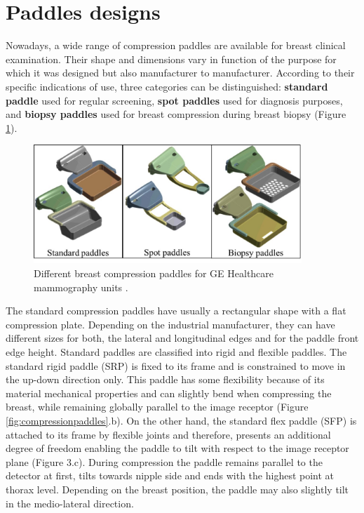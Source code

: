 \section{Paddles designs} \label{section:compressionpaddlesdesign}

Nowadays, a wide range of compression paddles are available for breast clinical examination. Their shape and dimensions vary in function of the purpose for which it was designed but also manufacturer to manufacturer. According to their specific
indications of use, three categories can be distinguished: \textbf{standard paddle} used for regular screening, \textbf{spot paddles} used for diagnosis purposes, and \textbf{biopsy paddles} used for breast compression during breast biopsy (Figure \ref{fig:compressionpaddlestypes}). 


\begin{figure}[!h]
\centering
\includegraphics[width=0.9\textwidth,keepaspectratio]{figures/compressionpaddlestypes.jpg} 
\caption{Different breast compression paddles for GE Healthcare mammography units .}\label{fig:compressionpaddlestypes}
\end{figure}
    

 The standard compression paddles have usually a rectangular shape with a flat compression plate. Depending on the industrial manufacturer, they can have different sizes for both, the lateral and longitudinal edges and for the paddle front edge height.  Standard paddles are classified into rigid and flexible paddles. The standard rigid paddle (SRP) is fixed to its frame and is constrained to move in the up-down direction only. This paddle has some flexibility because of its material mechanical properties and can slightly bend when compressing the breast, while remaining globally parallel to the image receptor (Figure \ref{fig:compressionpaddles}.b). On the other hand, the standard flex paddle (SFP)  is attached to its frame by flexible joints and therefore, presents an additional degree of freedom enabling the paddle to tilt with respect to the image receptor plane (Figure 3.c). During compression the paddle remains parallel to the detector at
first, tilts towards nipple side and ends with the highest point at
thorax level. Depending on the breast position, the paddle may also slightly tilt in the medio-lateral direction.

